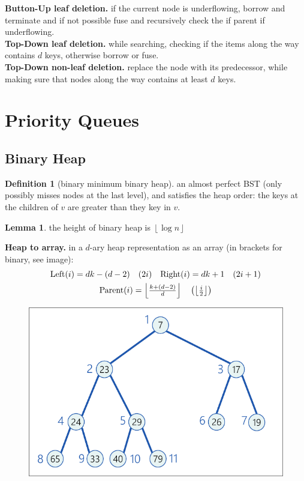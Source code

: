 \documentclass[]{article}
\newcommand\compactsubsection[1]        {\vspace{-10pt}\subsection{#1}\vspace{-6pt}}
\newcommand\compactsection   [1]        {\vspace{-10pt}\section{#1}\vspace{-6pt}}
\newcommand\subsectionrightaftersection {\vspace{10pt}}
\theoremstyle{definition}
\newtheorem{Definition}{\color{defiColor}Definition}
\newtheorem{Lemma}{\color{lemColor}Lemma}
\newcommand\lem   [1] {\begin{Lemma}#1\end{Lemma}}
\newcommand\rf    {\right\rfloor}
\newcommand\lf    {\left\lfloor}
\newcommand\floor [1] {\lf #1 \rf}
\newcommand\logn      {\log n}
\newcommand\cl [1]    {\left ( #1 \right )}
\begin{document}
\begin{multicols}{4}
					\textbf{Button-Up leaf deletion. }if the current node is underflowing, borrow and terminate and if not possible fuse and recursively check the if parent if underflowing. \\
					\textbf{Top-Down leaf deletion. }while searching, checking if the items along the way contains $d$ keys, otherwise borrow or fuse. \\
					\textbf{Top-Down non-leaf deletion. }replace the node with its predecessor, while making sure that nodes along the way contains at least $d$ keys. 
		
		\vspace{-2pt}
		\vspace{-3pt}
		\compactsection{Priority Queues}\subsectionrightaftersection
			\vspace{-4pt}
			\compactsubsection{Binary Heap}
				\begin{Definition}[binary minimum binary heap]
					an almost perfect BST (only possibly misses nodes at the last level), and satisfies the heap order: the keys at the children of $v$ are greater than they key in $v$. 
				\end{Definition}
				\lem{the height of binary heap is $\floor{\logn}$}				
				\textbf{Heap to array. }in a $d$-ary heap representation as an array (in brackets for binary, see image): 
				\vspace{-7pt}\begin{gather*}
					\textstyle \text{\rm Left}(i) = dk - (d-2) \quad (2i) \quad \text{\rm Right}(i) = dk + 1 \quad (2i + 1) \\ 
					\textstyle \text{\rm Parent}(i) = \floor{\frac{k + (d - 2)}{d}} \quad\cl{\floor{\frac{i}{2}}}
				\end{gather*}\vspace{-11pt}
				\begin{figure}
					\includegraphics[width=\linewidth]{images/binaryHeapIntoArray}

\end{figure}
\end{multicols}
\end{document}
